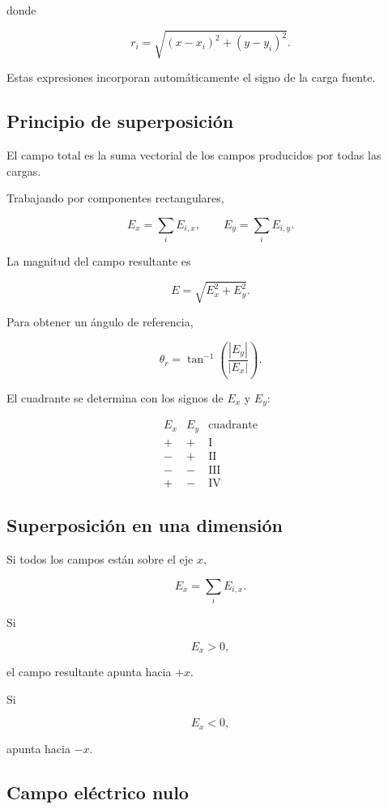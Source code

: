 donde

\[
r_i=\sqrt{(x-x_i)^2+(y-y_i)^2}.
\]

Estas expresiones incorporan automáticamente el signo de la carga fuente.


\subsection{Principio de superposición}

El campo total es la suma vectorial de los campos producidos por todas las cargas.

Trabajando por componentes rectangulares,

\[
\boxed{E_x=\sum_i E_{i,x}},
\qquad
\boxed{E_y=\sum_i E_{i,y}}.
\]

La magnitud del campo resultante es

\[
\boxed{E=\sqrt{E_x^2+E_y^2}}.
\]

Para obtener un ángulo de referencia,

\[
\boxed{
\theta_r=
\tan^{-1}\left(\frac{|E_y|}{|E_x|}\right)
}.
\]

El cuadrante se determina con los signos de \(E_x\) y \(E_y\):

\[
\begin{array}{c|c|c}
E_x & E_y & \text{cuadrante}\\
\hline
+ & + & \text{I}\\
- & + & \text{II}\\
- & - & \text{III}\\
+ & - & \text{IV}
\end{array}
\]


\subsection{Superposición en una dimensión}

Si todos los campos están sobre el eje \(x\),

\[
\boxed{E_x=\sum_iE_{i,x}}.
\]

Si

\[
E_x>0,
\]

el campo resultante apunta hacia \(+x\).

Si

\[
E_x<0,
\]

apunta hacia \(-x\).


\subsection{Campo eléctrico nulo}

